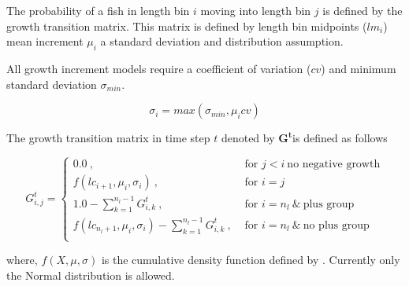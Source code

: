 The probability of a fish in length bin \(i\) moving into length bin \(j\) is defined by the growth transition matrix. This matrix is defined by length bin midpoints (\(lm_i\)) mean increment \(\mu_i\) a standard deviation and distribution assumption.

All growth increment models require a coefficient of variation (\(cv\)) and minimum standard deviation \(\sigma_{min}\). 

\[
\sigma_i = max(\sigma_{min}, \mu_i cv)
\]

The growth transition matrix in time step \(t\) denoted by \(\mathbf{G^t}\)is defined as follows

\begin{equation}
G^t_{i,j} = 
\begin{cases}
0.0 \ , & \text{ for } j < i \ \text{no negative growth}\\
f(lc_{i + 1},\mu_i, \sigma_i) \ , & \text{ for } i = j \\
1.0 - \sum\limits_{k = 1}^{n_l - 1}G^t_{i,k} \ , & \text{ for } i = n_l \ \& \ \text{plus group} \\
f(lc_{n_l + 1},\mu_i, \sigma_i) - \sum\limits_{k = 1}^{n_l - 1}G^t_{i,k} \ , & \text{ for } i = n_l \ \&  \  \text{no plus group} \\		
\end{cases}
\end{equation}

where, \(f(X,\mu, \sigma)\) is the cumulative density function defined by . Currently only the Normal distribution is allowed.
